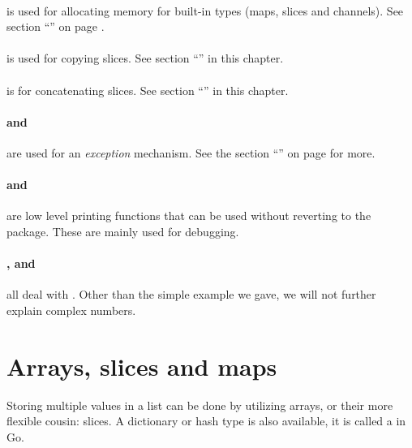 \paragraph{} is used for allocating memory for built-in
types (maps, slices and channels). See section 
``'' on page
\pageref{sec:allocation with make}.

\paragraph{} is used for copying slices. 
See section ``'' in this chapter.

\paragraph{} is for concatenating slices. 
See section ``'' in this chapter.

\paragraph{ and } are used for an 
\emph{exception} mechanism. See the section ``'' on 
page \pageref{sec:panic} for more.

\paragraph{ and } are low level printing
functions that can be used without reverting to the
package. These are mainly used for debugging.

\paragraph{,  and } all deal with
. Other than the simple example
we gave, we will not further explain complex numbers.


\section{Arrays, slices and maps}
\label{sec:arrays}
Storing multiple values in a list can be done by utilizing arrays, or
their more flexible cousin: slices. A dictionary or hash type is also
available, it is called a  in Go.

